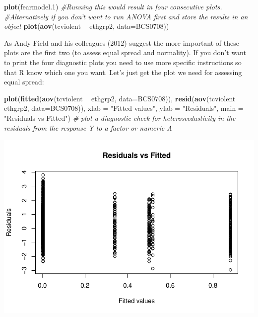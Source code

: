 \documentclass[]{book}
\newenvironment{Shaded}{\begin{snugshade}}{\end{snugshade}}
\newcommand{\CommentTok}[1]{\textcolor[rgb]{0.56,0.35,0.01}{\textit{#1}}}
\newcommand{\DataTypeTok}[1]{\textcolor[rgb]{0.13,0.29,0.53}{#1}}
\newcommand{\FloatTok}[1]{\textcolor[rgb]{0.00,0.00,0.81}{#1}}
\newcommand{\KeywordTok}[1]{\textcolor[rgb]{0.13,0.29,0.53}{\textbf{#1}}}
\newcommand{\NormalTok}[1]{#1}
\newcommand{\OperatorTok}[1]{\textcolor[rgb]{0.81,0.36,0.00}{\textbf{#1}}}
\newcommand{\StringTok}[1]{\textcolor[rgb]{0.31,0.60,0.02}{#1}}
\theoremstyle{definition}
\theoremstyle{definition}
\theoremstyle{definition}
\theoremstyle{remark}
\begin{document}
\begin{Shaded}
\begin{Highlighting}[]
\KeywordTok{plot}\NormalTok{(fearmodel}\FloatTok{.1}\NormalTok{) }\CommentTok{#Running this would result in four consecutive plots.}
\CommentTok{#Alternatively if you don't want to run ANOVA first and store the results in an object}
\KeywordTok{plot}\NormalTok{(}\KeywordTok{aov}\NormalTok{(tcviolent }\OperatorTok{~}\StringTok{ }\NormalTok{ethgrp2, }\DataTypeTok{data=}\NormalTok{BCS0708))}
\end{Highlighting}
\end{Shaded}

As Andy Field and his colleagues (2012) suggest the more important of
these plots are the first two (to assess equal spread and normality). If
you don't want to print the four diagnostic plots you need to use more
specific instructions so that R know which one you want. Let's just get
the plot we need for assessing equal spread:

\begin{Shaded}
\begin{Highlighting}[]
\KeywordTok{plot}\NormalTok{(}\KeywordTok{fitted}\NormalTok{(}\KeywordTok{aov}\NormalTok{(tcviolent }\OperatorTok{~}\StringTok{ }\NormalTok{ethgrp2, }\DataTypeTok{data=}\NormalTok{BCS0708)), }\KeywordTok{resid}\NormalTok{(}\KeywordTok{aov}\NormalTok{(tcviolent }\OperatorTok{~}\StringTok{ }\NormalTok{ethgrp2, }\DataTypeTok{data=}\NormalTok{BCS0708)), }\DataTypeTok{xlab =} \StringTok{"Fitted values"}\NormalTok{, }\DataTypeTok{ylab =} \StringTok{"Residuals"}\NormalTok{, }\DataTypeTok{main =} \StringTok{"Residuals vs Fitted"}\NormalTok{)     }\CommentTok{# plot a diagnostic check for heteroscedasticity in the residuals from the response Y to a factor or numeric A}
\end{Highlighting}
\end{Shaded}

\includegraphics{06-hypothesis_testing_files/figure-latex/unnamed-chunk-12-1.pdf}
\end{document}
